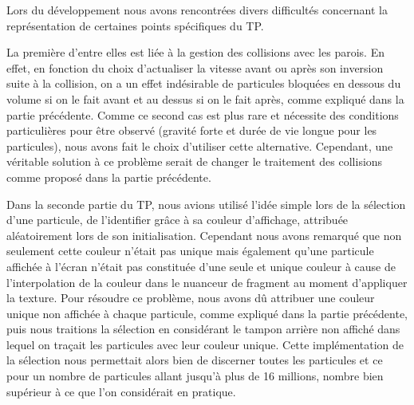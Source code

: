 Lors du développement nous avons rencontrées divers difficultés concernant la représentation de certaines points spécifiques du TP.

La première d'entre elles est liée à la gestion des collisions avec les parois.
En effet, en fonction du choix d'actualiser la vitesse avant ou après son inversion suite à la collision, on a un effet indésirable de particules bloquées en dessous du volume si on le fait avant et au dessus si on le fait après, comme expliqué dans la partie précédente.
Comme ce second cas est plus rare et nécessite des conditions particulières pour être observé (gravité forte et durée de vie longue pour les particules), nous avons fait le choix d'utiliser cette alternative.
Cependant, une véritable solution à ce problème serait de changer le traitement des collisions comme proposé dans la partie précédente.

Dans la seconde partie du TP, nous avions utilisé l'idée simple lors de la sélection d'une particule, de l'identifier grâce à sa couleur d'affichage, attribuée aléatoirement lors de son initialisation.
Cependant nous avons remarqué que non seulement cette couleur n'était pas unique mais également qu'une particule affichée à l'écran n'était pas constituée d'une seule et unique couleur à cause de l'interpolation de la couleur dans le nuanceur de fragment au moment d'appliquer la texture.
Pour résoudre ce problème, nous avons dû attribuer une couleur unique non affichée à chaque particule, comme expliqué dans la partie précédente, puis nous traitions la sélection en considérant le tampon arrière non affiché dans lequel on traçait les particules avec leur couleur unique.
Cette implémentation de la sélection nous permettait alors bien de discerner toutes les particules et ce pour un nombre de particules allant jusqu'à plus de 16 millions, nombre bien supérieur à ce que l'on considérait en pratique.


